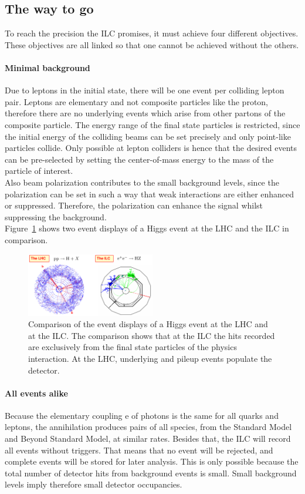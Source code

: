 \subsection{The way to go}
To reach the precision the ILC promises, it must achieve four different objectives.
These objectives are all linked so that one cannot be achieved without the others.

\paragraph{Minimal background}
Due to leptons in the initial state, there will be one event per colliding lepton pair.
Leptons are elementary and not composite particles like the proton, therefore there are no underlying events which arise from other partons of the composite particle.
The energy range of the final state particles is restricted, since the initial energy of the colliding beams can be set precisely and only point-like particles collide.
Only possible at lepton colliders is hence that the desired events can be pre-selected by setting the center-of-mass energy to the mass of the particle of interest.\\
Also beam polarization contributes to the small background levels, since the polarization can be set in such a way that weak interactions are either enhanced or suppressed.
Therefore, the polarization can enhance the signal whilst suppressing the background.\\
Figure~\ref{fig:Cleanliness} shows two event displays of a Higgs event at the LHC and the ILC in comparison.
\begin{figure}[H]
\centering
\includegraphics[width=0.5\textwidth]{Figures/Cleanliness.png}
\caption[Clean environment at the ILC]{Comparison of the event displays of a Higgs event at the  LHC and at the ILC.\cite[p. 4]{ILCPhysics_Thomson}
The comparison shows that at the ILC the hits recorded are exclusively from the final state particles of the physics interaction.
At the LHC, underlying and pileup events populate the detector.}
\label{fig:Cleanliness}
\end{figure}

\paragraph{All events alike}
Because the elementary coupling e of photons is the same for all quarks and leptons, the \electron \positron annihilation produces pairs of all species, from the Standard Model and Beyond Standard Model, at similar rates.
Besides that, the ILC will record all events without triggers.
That means that no event will be rejected, and complete events will be stored for later analysis.
This is only possible because the total number of detector hits from background events is small.
Small background levels imply therefore small detector occupancies.

